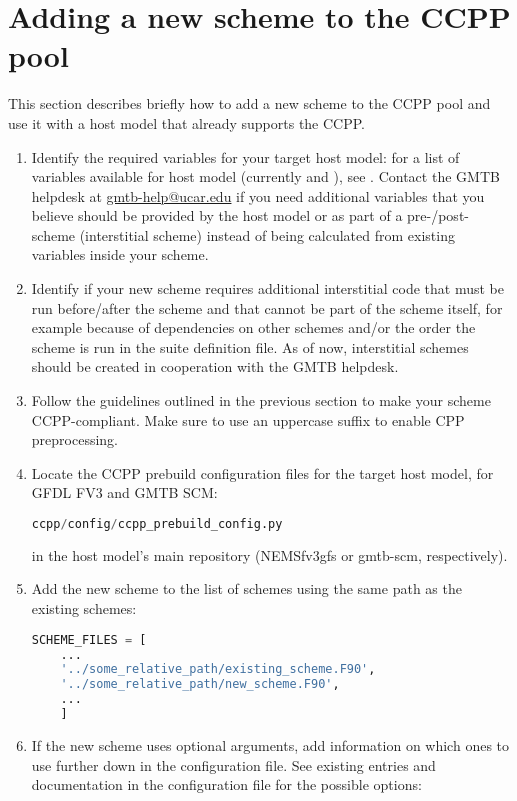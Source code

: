 \section{Adding a new scheme to the CCPP pool}
\label{sec_addscheme}
This section describes briefly how to add a new scheme to the CCPP pool and use it with a host model that already supports the CCPP.
\begin{enumerate}
\item Identify the required variables for your target host model: for a list of variables available for host model  (currently  and ), see . Contact the GMTB helpdesk at \url{gmtb-help@ucar.edu} if you need additional variables that you believe should be provided by the host model or as part of a pre-/post-scheme (interstitial scheme) instead of being calculated from existing variables inside your scheme.
\item Identify if your new scheme requires additional interstitial code that must be run before/after the scheme and that cannot be part of the scheme itself, for example because of dependencies on other schemes and/or the order the scheme is run in the suite definition file. As of now, interstitial schemes should be created in cooperation with the GMTB helpdesk.
\item Follow the guidelines outlined in the previous section to make your scheme CCPP-compliant. Make sure to use an uppercase suffix  to enable CPP preprocessing.
\item Locate the CCPP prebuild configuration files for the target host model, for GFDL FV3 and GMTB SCM:
\begin{lstlisting}[language=Python]
ccpp/config/ccpp_prebuild_config.py
\end{lstlisting}
in the host model's main repository (NEMSfv3gfs or gmtb-scm, respectively).
\item Add the new scheme to the list of schemes using the same path as the existing schemes:
\begin{samepage}
\begin{lstlisting}[language=Python]
SCHEME_FILES = [
    ...
    '../some_relative_path/existing_scheme.F90',
    '../some_relative_path/new_scheme.F90',
    ...
    ]
\end{lstlisting}
\end{samepage}
\item If the new scheme uses optional arguments, add information on which ones to use further down in the configuration file. See existing entries and documentation in the configuration file for the possible options:

\end{enumerate}
